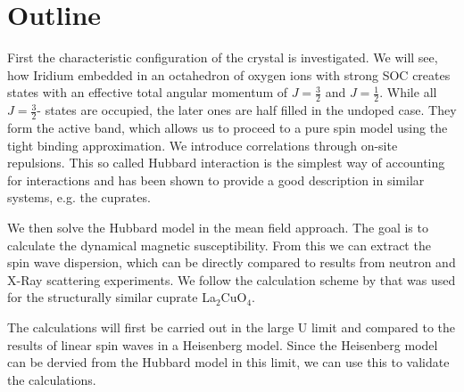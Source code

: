 \documentclass[a4paper,12pt]{report}
\begin{document}





\section{Outline}

First the characteristic configuration of the crystal is  investigated.
We will see, how Iridium embedded in an octahedron of oxygen ions  with strong  SOC
creates states with an effective total angular momentum of $J=\frac32$ and $J=\frac12$.
While all $J=\frac32$- states are occupied, the later ones are half filled in the undoped case.
They form the active band, which allows us to proceed to a pure spin model using the tight binding approximation.
We introduce  correlations through on-site repulsions. 
This so called Hubbard interaction is the simplest way of accounting for interactions 
and has been shown to provide a good description in similar systems, e.g. the cuprates.

We then solve the Hubbard model in the mean field approach.
The goal is to calculate the dynamical magnetic susceptibility.
From this we can extract the spin wave dispersion, which 
can be directly compared to results from neutron and X-Ray scattering experiments.
We follow the calculation scheme by  \citet{PhysRevB.65.132404} that was used for the structurally similar cuprate La$_2$CuO$_4$.

The calculations will first be carried out in the large U limit and compared to the results of linear spin waves in a Heisenberg model.
Since the Heisenberg model can be dervied from the Hubbard model in this limit, we can use this to validate the calculations.
\end{document}
